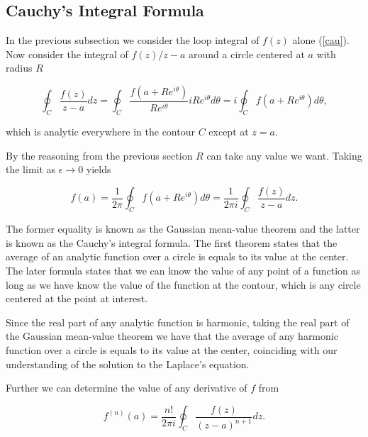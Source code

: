 \documentclass[english,a4paper,12pt]{report}
\begin{document}


\subsection{Cauchy's Integral Formula} 

In the previous subsection we consider the loop integral of \(f(z)\) alone (\cref{cau}). Now consider the integral of \(f(z) /z-a\) around a circle centered at \(a\) with radius \(R\) 

\begin{equation}
    \oint_{C} \frac{f(z)}{z-a}dz = \oint_{C} \frac{f(a+Re^{i \theta } )}{R e^{i \theta } } i Re^{i \theta } d \theta = i \oint_{C} f(a + Re^{i \theta } ) d \theta ,
\end{equation}

which is analytic everywhere in the contour \(C\) except at \(z = a\). 

By the reasoning from the previous section \(R\) can take any value we want. Taking the limit as \(\epsilon \to 0\) yields 

\begin{equation}
   f(a) = \frac{1}{2\pi } \oint_{C} f(a+Re^{i \theta } ) d \theta = \frac{1}{2\pi i}  \oint_{C} \frac{f(z)}{z-a} dz .  \label{cau2} 
\end{equation}

The former equality is known as the Gaussian mean-value theorem and the latter is known as the Cauchy's integral formula. The first theorem states that the average of an analytic function over a circle is equals to its value at the center. The later formula states that we can know the value of any point of a function as long as we have know the value of the function at the contour, which is any circle centered at the point at interest.

Since the real part of any analytic function is harmonic, taking the real part of the Gaussian mean-value theorem we have that the average of any harmonic function over a circle is equals to its value at the center, coinciding with our understanding of the solution to the Laplace's equation.

Further we can determine the value of any derivative of \(f\) from 

\begin{equation}
    f^{(n)}(a) = \frac{n!}{2\pi i} \oint_{C} \frac{f(z)}{(z-a)^{n+1} } dz. 
\end{equation}
\end{document}
